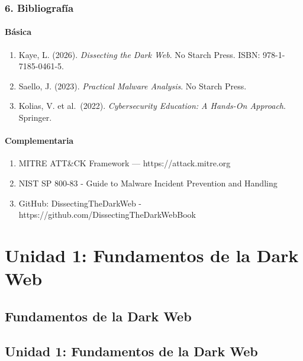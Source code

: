\documentclass[
  letterpaper,
]{report}
\providecommand{\tightlist}{%
  \setlength{\itemsep}{0pt}\setlength{\parskip}{0pt}}
\begin{document}
\section{6. Bibliografía}\label{bibliografuxeda}

\subsection{Básica}\label{buxe1sica}

\begin{enumerate}
\def\labelenumi{\arabic{enumi}.}
\tightlist
\item
  Kaye, L. (2026). \emph{Dissecting the Dark Web}. No Starch Press.
  ISBN: 978-1-7185-0461-5.
\item
  Saello, J. (2023). \emph{Practical Malware Analysis}. No Starch Press.
\item
  Kolias, V. et al.~(2022). \emph{Cybersecurity Education: A Hands-On
  Approach}. Springer.
\end{enumerate}

\subsection{Complementaria}\label{complementaria}

\begin{enumerate}
\def\labelenumi{\arabic{enumi}.}
\tightlist
\item
  MITRE ATT\&CK Framework --- https://attack.mitre.org
\item
  NIST SP 800-83 - Guide to Malware Incident Prevention and Handling
\item
  GitHub: DissectingTheDarkWeb -
  https://github.com/DissectingTheDarkWebBook
\end{enumerate}

\part{Unidad 1: Fundamentos de la Dark Web}

\chapter{Fundamentos de la Dark Web}\label{fundamentos-de-la-dark-web}

\chapter{Unidad 1: Fundamentos de la Dark
Web}\label{unidad-1-fundamentos-de-la-dark-web-1}
\end{document}
